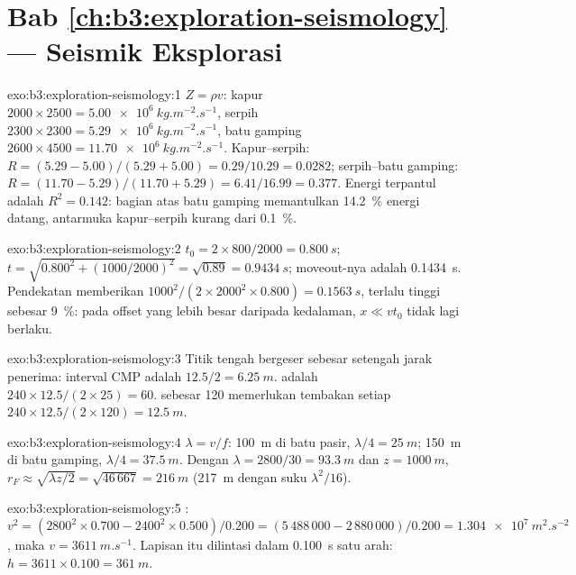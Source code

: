 \section*{Bab \ref{ch:b3:exploration-seismology} --- Seismik Eksplorasi}

\begin{solution}{exo:b3:exploration-seismology:1}
$Z = \rho v$: kapur $2000\times2500 = \qty{5.00e6}{kg.m^{-2}.s^{-1}}$, serpih
$2300\times2300 = \qty{5.29e6}{kg.m^{-2}.s^{-1}}$, batu gamping $2600\times4500 =
\qty{11.70e6}{kg.m^{-2}.s^{-1}}$. Kapur--serpih: $R = (5.29 - 5.00)/(5.29 + 5.00)
= 0.29/10.29 = 0.0282$; serpih--batu gamping: $R = (11.70 - 5.29)/(11.70 + 5.29) =
6.41/16.99 = 0.377$. Energi terpantul adalah $R^2 = 0.142$: bagian atas
batu gamping memantulkan \qty{14.2}{\percent} energi datang, antarmuka
kapur--serpih kurang dari \qty{0.1}{\percent}.
\end{solution}

\begin{solution}{exo:b3:exploration-seismology:2}
$t_0 = 2\times800/2000 = \qty{0.800}{s}$; $t = \sqrt{0.800^2 + (1000/2000)^2} =
\sqrt{0.89} = \qty{0.9434}{s}$; moveout-nya adalah \qty{0.1434}{s}. Pendekatan
memberikan $1000^2/(2\times2000^2\times0.800) = \qty{0.1563}{s}$, terlalu
tinggi sebesar \qty{9}{\percent}: pada offset yang lebih besar daripada kedalaman, $x \ll vt_0$ tidak
lagi berlaku.
\end{solution}

\begin{solution}{exo:b3:exploration-seismology:3}
Titik tengah bergeser sebesar setengah jarak penerima: interval CMP adalah
$12.5/2 = \qty{6.25}{m}$.  adalah $240\times12.5/(2\times25) = 60$. 
sebesar 120 memerlukan tembakan setiap $240\times12.5/(2\times120) = \qty{12.5}{m}$.
\end{solution}

\begin{solution}{exo:b3:exploration-seismology:4}
$\lambda = v/f$: \qty{100}{m} di batu pasir, $\lambda/4 = \qty{25}{m}$;
\qty{150}{m} di batu gamping, $\lambda/4 = \qty{37.5}{m}$. Dengan
$\lambda = 2800/30 = \qty{93.3}{m}$ dan $z = \qty{1000}{m}$,
$r_F \approx \sqrt{\lambda z/2} = \sqrt{46\,667} = \qty{216}{m}$ (\qty{217}{m}
dengan suku $\lambda^2/16$).
\end{solution}

\begin{solution}{exo:b3:exploration-seismology:5}
: $v^2 = (2800^2\times0.700 - 2400^2\times0.500)/0.200 = (5\,488\,000 -
2\,880\,000)/0.200 = \qty{1.304e7}{m^2.s^{-2}}$, maka $v = \qty{3611}{m.s^{-1}}$.
Lapisan itu dilintasi dalam \qty{0.100}{s} satu arah: $h = 3611\times0.100 =
\qty{361}{m}$.
\end{solution}

